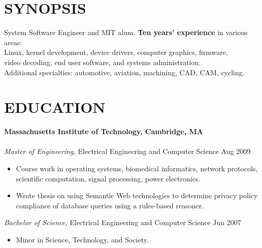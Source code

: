 \documentclass[line,margin]{res}
\begin{document}
\thispagestyle{empty}

\address{1201 West Park Street, Cedar Park, TX 78613-2801}
\address{\href{mailto:jsoltren@alum.mit.edu}{jsoltren@alum.mit.edu}
         (347) 503-9558
         \url{https://www.linkedin.com/in/jsoltren}}

\begin{resume}
 
\section{SYNOPSIS}
System Software Engineer and MIT alum. \textbf{Ten years’ experience}
in various areas:\\
Linux, kernel development, device drivers, computer graphics, firmware,\\
video decoding, end user software, and systems administration.\\
Additional specialties: automotive, aviation, machining, CAD, CAM, cycling.
 
 
\section{EDUCATION}

\textbf{Massachusetts Institute of Technology, Cambridge, MA} \\
\\
\textit{Master of Engineering,} Electrical Engineering and Computer Science
\hfill Aug 2009
\begin{itemize}  \itemsep -2pt %
\item Course work in operating systems, biomedical informatics, network
      protocols, scientific computation, signal processing, power electronics.
\item Wrote thesis on using Semantic Web technologies to determine privacy
      policy compliance of database queries using a rules-based reasoner.
\end{itemize} 
\textit{Bachelor of Science,} Electrical Engineering and Computer Science
\hfill Jun 2007
\begin{itemize}  \itemsep -2pt %
\item Minor in Science, Technology, and Society.
\end{itemize}


\end{resume}
\end{document}
